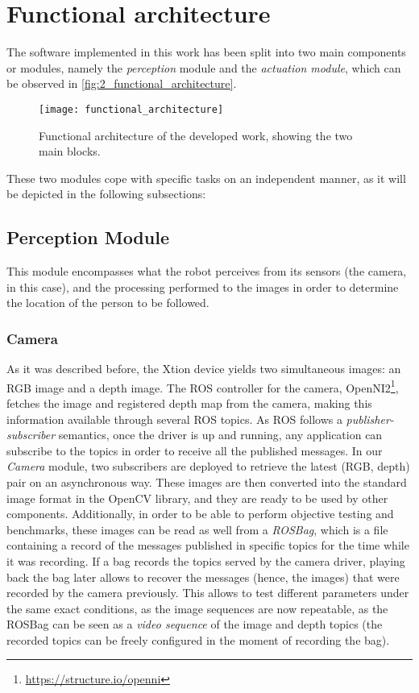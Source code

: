 \section{Functional architecture}
\label{sec:2_functional_architecture}
The software implemented in this work has been split into two main components or modules, namely the \textit{perception} module and the \textit{actuation module}, which can be observed in \autoref{fig:2_functional_architecture}.

\begin{figure}[h]
	\centering
	\texttt{[image: functional\_architecture]}
	\caption{Functional architecture of the developed work, showing the two main blocks.}
	\label{fig:2_functional_architecture}
\end{figure}

These two modules cope with specific tasks on an independent manner, as it will be depicted in the following subsections:

\subsection{Perception Module}
This module encompasses what the robot perceives from its sensors (the camera, in this case), and the processing performed to the images in order to determine the location of the person to be followed.
\subsubsection{Camera}
As it was described before, the Xtion device yields two simultaneous images: an RGB image and a depth image. The ROS controller for the camera, OpenNI2\footnote{\url{https://structure.io/openni}}, fetches the image and registered depth map from the camera, making this information available through several ROS topics. As ROS follows a \textit{publisher-subscriber} semantics, once the driver is up and running, any application can subscribe to the topics in order to receive all the published messages. In our \textit{Camera} module, two subscribers are deployed to retrieve the latest (RGB, depth) pair on an asynchronous way. These images are then converted into the standard image format in the OpenCV library, and they are ready to be used by other components. Additionally, in order to be able to perform objective testing and benchmarks, these images can be read as well from a \textit{ROSBag}, which is a file containing a record of the messages published in specific topics for the time while it was recording. If a bag records the topics served by the camera driver, playing back the bag later allows to recover the messages (hence, the images) that were recorded by the camera previously. This allows to test different parameters under the same exact conditions, as the image sequences are now repeatable, as the ROSBag can be seen as a \textit{video sequence} of the image and depth topics (the recorded topics can be freely configured in the moment of recording the bag).\\

